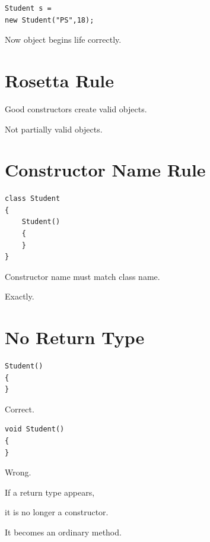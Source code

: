 \documentclass[11pt,a4paper]{book}
\begin{document}
\begin{verbatim}
Student s =
new Student("PS",18);
\end{verbatim}

Now object begins life correctly.


\section{Rosetta Rule}

Good constructors create valid objects.

Not partially valid objects.


\section{Constructor Name Rule}

\begin{verbatim}
class Student
{
    Student()
    {
    }
}
\end{verbatim}

Constructor name must match class name.

Exactly.


\section{No Return Type}

\begin{verbatim}
Student()
{
}
\end{verbatim}

Correct.

\begin{verbatim}
void Student()
{
}
\end{verbatim}

Wrong.


\begin{trap}

If a return type appears,

it is no longer a constructor.

It becomes an ordinary method.

\end{trap}
\end{document}
